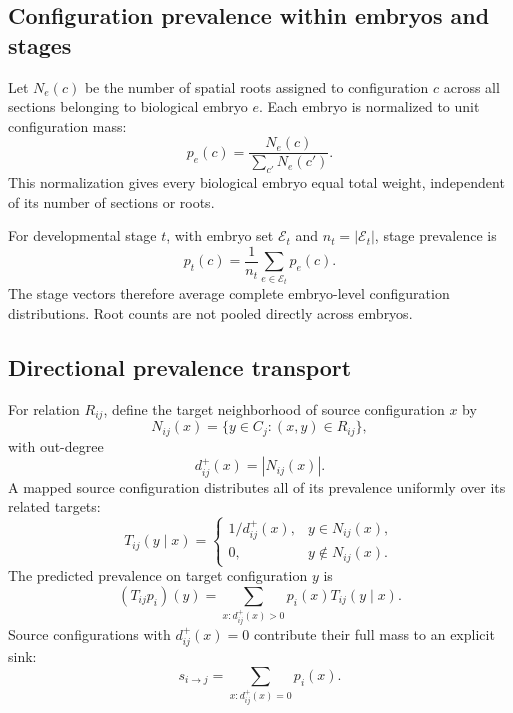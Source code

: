 \documentclass[11pt]{article}
\begin{document}
\subsection{Configuration prevalence within embryos and stages}

Let \(N_e(c)\) be the number of spatial roots assigned to configuration \(c\) across all sections belonging to biological embryo \(e\). Each embryo is normalized to unit configuration mass:
\begin{equation}
p_e(c)
=
\frac{N_e(c)}
{\sum_{c'}N_e(c')}.
\label{eq:embryoprev}
\end{equation}
This normalization gives every biological embryo equal total weight, independent of its number of sections or roots.

For developmental stage \(t\), with embryo set \(\mathcal E_t\) and \(n_t=|\mathcal E_t|\), stage prevalence is
\begin{equation}
p_t(c)
=
\frac1{n_t}
\sum_{e\in\mathcal E_t}
p_e(c).
\label{eq:stageprev}
\end{equation}
The stage vectors therefore average complete embryo-level configuration distributions. Root counts are not pooled directly across embryos.

\subsection{Directional prevalence transport}

For relation \(R_{ij}\), define the target neighborhood of source configuration \(x\) by
\[
N_{ij}(x)
=
\{y\in C_j:(x,y)\in R_{ij}\},
\]
with out-degree
\[
d_{ij}^{+}(x)=|N_{ij}(x)|.
\]
A mapped source configuration distributes all of its prevalence uniformly over its related targets:
\begin{equation}
T_{ij}(y\mid x)
=
\begin{cases}
1/d_{ij}^{+}(x),
& y\in N_{ij}(x),\\[3pt]
0,
& y\notin N_{ij}(x).
\end{cases}
\label{eq:transportkernel}
\end{equation}
The predicted prevalence on target configuration \(y\) is
\begin{equation}
(T_{ij}p_i)(y)
=
\sum_{x:d_{ij}^{+}(x)>0}
p_i(x)T_{ij}(y\mid x).
\label{eq:transport}
\end{equation}
Source configurations with \(d_{ij}^{+}(x)=0\) contribute their full mass to an explicit sink:
\begin{equation}
s_{i\rightarrow j}
=
\sum_{x:d_{ij}^{+}(x)=0}p_i(x).
\label{eq:sink}
\end{equation}
\end{document}

